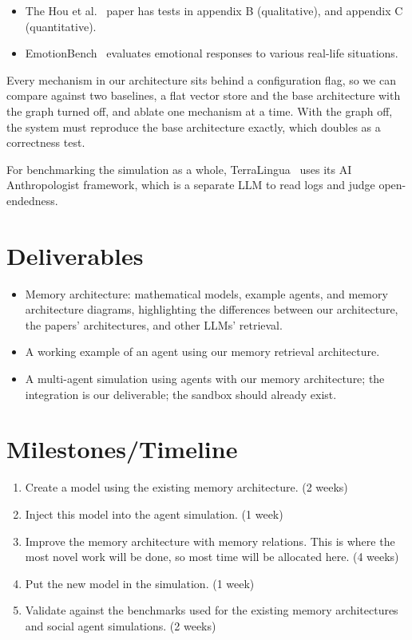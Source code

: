 \documentclass[11pt]{article}
\begin{document}
\begin{itemize}
  \item The Hou et al.~\cite{hou2024} paper has tests in appendix B (qualitative), and appendix C (quantitative).
  \item EmotionBench~\cite{huang2024} evaluates emotional responses to various real-life situations.
\end{itemize}

Every mechanism in our architecture sits behind a configuration flag, so we can compare against two baselines, a flat vector store and the base architecture with the graph turned off, and ablate one mechanism at a time. With the graph off, the system must reproduce the base architecture exactly, which doubles as a correctness test.

For benchmarking the simulation as a whole, TerraLingua~\cite{paolo2026} uses its AI Anthropologist framework, which is a separate LLM to read logs and judge open-endedness.

\section{Deliverables}
\begin{itemize}
  \item Memory architecture: mathematical models, example agents, and memory architecture diagrams, highlighting the differences between our architecture, the papers' architectures, and other LLMs' retrieval.
  \item A working example of an agent using our memory retrieval architecture.
  \item A multi-agent simulation using agents with our memory architecture; the integration is our deliverable; the sandbox should already exist.
\end{itemize}

\section{Milestones/Timeline}
\begin{enumerate}
  \item Create a model using the existing memory architecture. (2 weeks)
  \item Inject this model into the agent simulation. (1 week)
  \item Improve the memory architecture with memory relations. This is where the most novel work will be done, so most time will be allocated here. (4 weeks)
  \item Put the new model in the simulation. (1 week)
  \item Validate against the benchmarks used for the existing memory architectures and social agent simulations. (2 weeks)
\end{enumerate}
\end{document}
